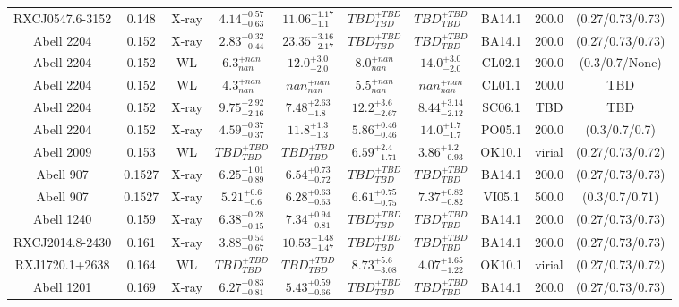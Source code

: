 \begin{table}
\begin{tabular}{cccccccccc}
RXCJ0547.6-3152 & 0.148 & X-ray & ${4.14}^{+0.57}_{-0.63}$ & ${11.06}^{+1.17}_{-1.1}$ & ${TBD}^{+TBD}_{TBD}$ & ${TBD}^{+TBD}_{TBD}$ & BA14.1 & 200.0 & (0.27/0.73/0.73) \\
Abell 2204 & 0.152 & X-ray & ${2.83}^{+0.32}_{-0.44}$ & ${23.35}^{+3.16}_{-2.17}$ & ${TBD}^{+TBD}_{TBD}$ & ${TBD}^{+TBD}_{TBD}$ & BA14.1 & 200.0 & (0.27/0.73/0.73) \\
Abell 2204 & 0.152 & WL & ${6.3}^{+nan}_{nan}$ & ${12.0}^{+3.0}_{-2.0}$ & ${8.0}^{+nan}_{nan}$ & ${14.0}^{+3.0}_{-2.0}$ & CL02.1 & 200.0 & (0.3/0.7/None) \\
Abell 2204 & 0.152 & WL & ${4.3}^{+nan}_{nan}$ & ${nan}^{+nan}_{nan}$ & ${5.5}^{+nan}_{nan}$ & ${nan}^{+nan}_{nan}$ & CL01.1 & 200.0 & TBD \\
Abell 2204 & 0.152 & X-ray & ${9.75}^{+2.92}_{-2.16}$ & ${7.48}^{+2.63}_{-1.8}$ & ${12.2}^{+3.6}_{-2.67}$ & ${8.44}^{+3.14}_{-2.12}$ & SC06.1 & TBD & TBD \\
Abell 2204 & 0.152 & X-ray & ${4.59}^{+0.37}_{-0.37}$ & ${11.8}^{+1.3}_{-1.3}$ & ${5.86}^{+0.46}_{-0.46}$ & ${14.0}^{+1.7}_{-1.7}$ & PO05.1 & 200.0 & (0.3/0.7/0.7) \\
Abell 2009 & 0.153 & WL & ${TBD}^{+TBD}_{TBD}$ & ${TBD}^{+TBD}_{TBD}$ & ${6.59}^{+2.4}_{-1.71}$ & ${3.86}^{+1.2}_{-0.93}$ & OK10.1 & virial & (0.27/0.73/0.72) \\
Abell 907 & 0.1527 & X-ray & ${6.25}^{+1.01}_{-0.89}$ & ${6.54}^{+0.73}_{-0.72}$ & ${TBD}^{+TBD}_{TBD}$ & ${TBD}^{+TBD}_{TBD}$ & BA14.1 & 200.0 & (0.27/0.73/0.73) \\
Abell 907 & 0.1527 & X-ray & ${5.21}^{+0.6}_{-0.6}$ & ${6.28}^{+0.63}_{-0.63}$ & ${6.61}^{+0.75}_{-0.75}$ & ${7.37}^{+0.82}_{-0.82}$ & VI05.1 & 500.0 & (0.3/0.7/0.71) \\
Abell 1240 & 0.159 & X-ray & ${6.38}^{+0.28}_{-0.15}$ & ${7.34}^{+0.94}_{-0.81}$ & ${TBD}^{+TBD}_{TBD}$ & ${TBD}^{+TBD}_{TBD}$ & BA14.1 & 200.0 & (0.27/0.73/0.73) \\
RXCJ2014.8-2430 & 0.161 & X-ray & ${3.88}^{+0.54}_{-0.67}$ & ${10.53}^{+1.48}_{-1.47}$ & ${TBD}^{+TBD}_{TBD}$ & ${TBD}^{+TBD}_{TBD}$ & BA14.1 & 200.0 & (0.27/0.73/0.73) \\
RXJ1720.1+2638 & 0.164 & WL & ${TBD}^{+TBD}_{TBD}$ & ${TBD}^{+TBD}_{TBD}$ & ${8.73}^{+5.6}_{-3.08}$ & ${4.07}^{+1.65}_{-1.22}$ & OK10.1 & virial & (0.27/0.73/0.72) \\
Abell 1201 & 0.169 & X-ray & ${6.27}^{+0.83}_{-0.81}$ & ${5.43}^{+0.59}_{-0.66}$ & ${TBD}^{+TBD}_{TBD}$ & ${TBD}^{+TBD}_{TBD}$ & BA14.1 & 200.0 & (0.27/0.73/0.73) \\

\end{tabular}
\end{table}
